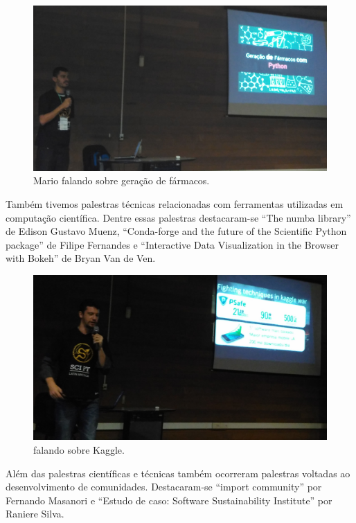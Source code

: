 \documentclass[12pt]{article}
\begin{document}
\begin{figure}[!htb]
\center
\includegraphics[height=.3\textheight]{talks-drugs.jpg}
\caption{Mario falando sobre geração de fármacos.}
\end{figure}

Também tivemos palestras técnicas relacionadas com ferramentas utilizadas em
computação científica. Dentre essas palestras destacaram-se ``The numba
library'' de Edison Gustavo Muenz, ``Conda-forge and the future of the
Scientific Python package'' de Filipe Fernandes e ``Interactive Data
Visualization in the Browser with Bokeh'' de Bryan Van de Ven.

\begin{figure}[!htb]
\center
\includegraphics[height=.3\textheight]{talks-kaggle.jpg}
\caption{falando sobre Kaggle.}
\end{figure}

Além das palestras científicas e técnicas também ocorreram palestras voltadas
ao desenvolvimento de comunidades. Destacaram-se ``import community'' por
Fernando Masanori e ``Estudo de caso: Software Sustainability Institute'' por
Raniere Silva.
\end{document}

